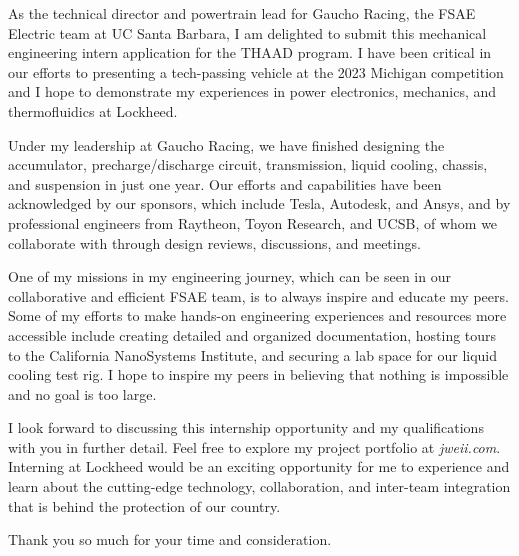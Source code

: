 \documentclass[11pt, letterpaper]{awesome-cv} %
\begin{document}
\makecvheader %

\makelettertitle %


\begin{cvletter}

As the technical director and powertrain lead for Gaucho Racing, the FSAE Electric team at UC Santa Barbara, I am delighted to submit this mechanical engineering intern application for the THAAD program. I have been critical in our efforts to presenting a tech-passing vehicle at the 2023 Michigan competition and I hope to demonstrate my experiences in power electronics, mechanics, and thermofluidics at Lockheed.

Under my leadership at Gaucho Racing, we have finished designing the accumulator, precharge/discharge circuit, transmission, liquid cooling, chassis, and suspension in just one year. Our efforts and capabilities have been acknowledged by our sponsors, which include Tesla, Autodesk, and Ansys, and by professional engineers from Raytheon, Toyon Research, and UCSB, of whom we collaborate with through design reviews, discussions, and meetings. 

One of my missions in my engineering journey, which can be seen in our collaborative and efficient FSAE team, is to always inspire and educate my peers. Some of my efforts to make hands-on engineering experiences and resources more accessible include creating detailed and organized documentation, hosting tours to the California NanoSystems Institute, and securing a lab space for our liquid cooling test rig. I hope to inspire my peers in believing that nothing is impossible and no goal is too large.

I look forward to discussing this internship opportunity and my qualifications with you in further detail. Feel free to explore my project portfolio at \textit{jweii.com}. Interning at Lockheed would be an exciting opportunity for me to experience and learn about the cutting-edge technology, collaboration, and inter-team integration that is behind the  protection of our country. 

Thank you so much for your time and consideration.



\end{cvletter}


\makeletterclosing %
\end{document}
